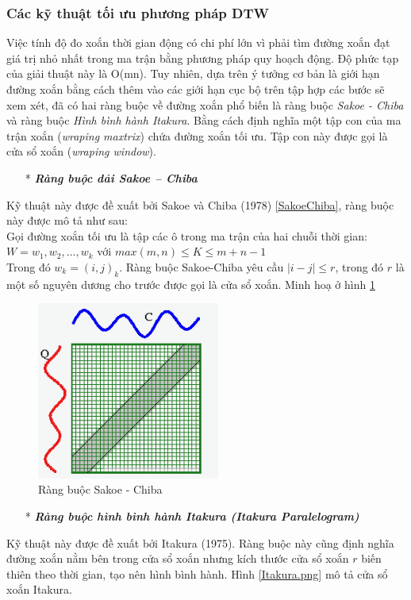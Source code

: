 \documentclass[13pt,oneside]{scrbook}
\begin{document}
\subsubsection{Các kỹ thuật tối ưu phương pháp DTW}
Việc tính độ đo xoắn thời gian động có chi phí lớn vì phải tìm đường xoắn đạt giá trị nhỏ nhất trong ma trận bằng phương pháp quy hoạch động. 
Độ phức tạp của giải thuật này là O(mn). 
Tuy nhiên, dựa trên ý tưởng cơ bản là giới hạn đường xoắn bằng cách thêm vào các giới hạn cục bộ trên tập hợp các bước sẽ xem xét, đã có hai ràng buộc về đường xoắn phổ biến là ràng buộc \textit{Sakoe - Chiba} và ràng buộc \textit{Hình bình hành Itakura}. 
Bằng cách định nghĩa một tập con của ma trận xoắn (\textit{wraping maxtrix}) chứa đường xoắn tối ưu. Tập con này được gọi là cửa sổ xoắn (\textit{wraping window}).
\begin{itemize}
	\item[*] \textit{\textbf {Ràng buộc dải Sakoe – Chiba}}
\end{itemize}
Kỹ thuật này được đề xuất bởi Sakoe và Chiba (1978) \ref{SakoeChiba}, ràng buộc này được mô tả như sau: \\
Gọi đường xoắn tối ưu là tập các ô trong ma trận của hai chuỗi thời gian:\\
$W = w_1, w_2, …, w_k$	 với $max(m, n) \le  K   \le m+ n -1$ \\
Trong đó $w_k = (i, j)_k$. Ràng buộc Sakoe-Chiba yêu cầu $|i - j| \le r$, trong đó $r$ là một số nguyên dương cho trước được gọi là cửa sổ xoắn. Minh hoạ ở hình \ref{SakoeChiba.png}
\begin{figure}[H]
	\begin{center}
		\includegraphics[width=60mm]{SakoeChiba.png}
		\caption{Ràng buộc Sakoe - Chiba}
		\label{SakoeChiba.png}
	\end{center}
\end{figure}
\begin{itemize}
	\item[*] \textit{\textbf {Ràng buộc hình bình hành Itakura (Itakura Paralelogram)}}
\end{itemize}
Kỹ thuật này được đề xuất bởi Itakura (1975). Ràng buộc này cũng định nghĩa đường xoắn nằm bên trong cửa sổ xoắn nhưng kích thước cửa sổ xoắn $r$ biến thiên theo thời gian, tạo nên hình bình hành. Hình \ref{Itakura.png} mô tả cửa sổ xoắn Itakura.
\end{document}
